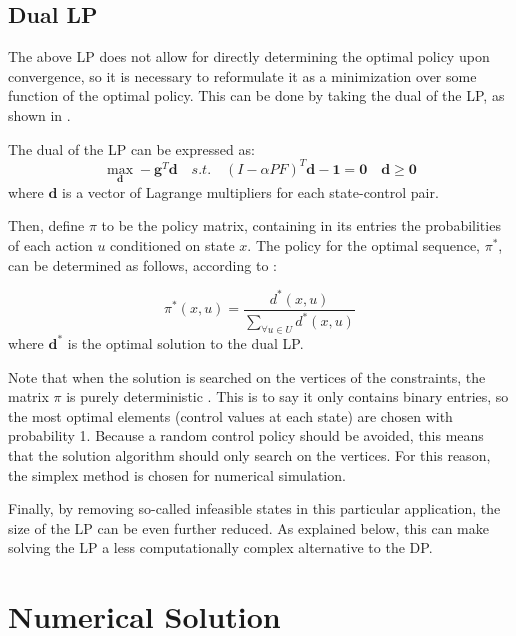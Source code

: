 \documentclass[conference]{IEEEtran}
\begin{document}
\subsection{Dual LP}
The above LP does not allow for directly determining the optimal policy upon convergence, so it is necessary to reformulate it as a minimization over some function of the optimal policy. This can be done by taking the dual of the LP, as shown in \cite{4220813}.

The dual of the LP can be expressed as:
\begin{equation}
    \max_{\boldsymbol{d}} -\boldsymbol{g}^{T} \boldsymbol{d}
    \hspace{1em}s.t.\hspace{1em}(I-\alpha PF)^{T}\boldsymbol{d} - \boldsymbol{1} = \boldsymbol{0}\hspace{1em}\boldsymbol{d} \geq \boldsymbol{0}
\end{equation}
where $\boldsymbol{d}$ is a vector of Lagrange multipliers for each state-control pair.


Then, define $\pi$ to be the policy matrix, containing in its entries the probabilities of each action $u$ conditioned on state $x$. The policy for the optimal sequence, $\pi^{*}$, can be determined as follows, according to \cite{4220813}:

\begin{equation}
\pi^{*}(x,u)=\frac{d^{*}(x,u)}{\sum_{\forall u \in U}d^{*}(x,u)}
\end{equation} where $\boldsymbol{d^{*}}$ is the optimal solution to the dual LP.

Note that when the solution is searched on the vertices of the constraints, the matrix $\pi$ is purely deterministic \cite{MDPs}. This is to say it only contains binary entries, so the most optimal elements (control values at each state) are chosen with probability 1. Because a random control policy should be avoided, this means that the solution algorithm should only search on the vertices. For this reason, the simplex method is chosen for numerical simulation.

Finally, by removing so-called infeasible states in this particular application, the size of the LP can be even further reduced. As explained below, this can make solving the LP a less computationally complex alternative to the DP.

\section{Numerical Solution}
\end{document}
